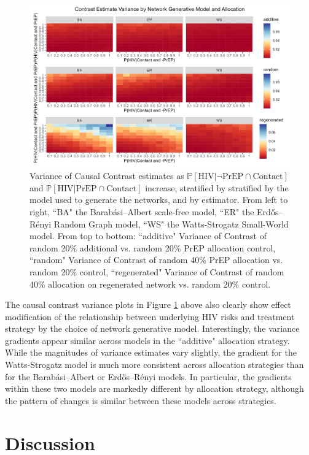 \documentclass{article}
\theoremstyle{definition}
\begin{document}
\begin{figure}[H]
    \centering
    \includegraphics[width=\linewidth]{Figures/Generative Model Variance plots.png}
    \caption{Variance of Causal Contrast estimates as $\mathbb{P}\left[\text{HIV} \vert \neg \text{PrEP} \cap \text{Contact}\right]$ and $\mathbb{P}\left[\text{HIV} \vert \text{PrEP} \cap \text{Contact}\right]$ increase, stratified by stratified by the model used to generate the networks, and by estimator. From left to right, ``BA" the Barabási–Albert scale-free model, ``ER" the Erdős–Rényi Random Graph model, ``WS" the Watts-Strogatz Small-World model. From top to bottom: ``additive" Variance of Contrast of random 20\% additional vs. random 20\% PrEP allocation control, ``random" Variance of Contrast of random 40\% PrEP allocation vs. random 20\% control, ``regenerated" Variance of Contrast of random 40\% allocation on regenerated network vs. random 20\% control.}
    \label{fig:Figure 24}
\end{figure}
The causal contrast variance plots in Figure \ref{fig:Figure 24} above also clearly show effect modification  of the relationship between underlying HIV risks and treatment strategy by the choice of network generative model.  Interestingly, the variance gradients appear similar across models in the ``additive" allocation strategy. While the magnitudes of variance estimates vary slightly, the gradient for the Watts-Strogatz model is much more consistent  across allocation strategies than for the Barabási–Albert or  Erdős–Rényi models. In particular, the gradients within these two models are markedly different by allocation strategy, although the pattern of changes is similar between these models across strategies.  

\section{Discussion}
\end{document}
